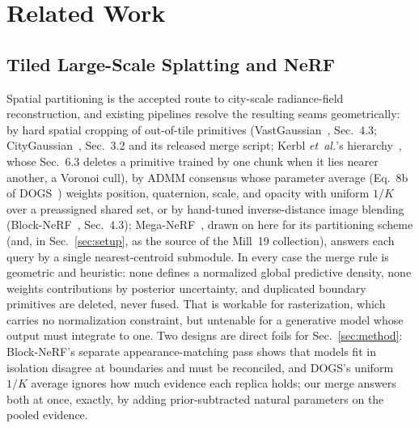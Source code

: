 
\section{Related Work}
\label{sec:related}

\subsection{Tiled Large-Scale Splatting and NeRF}
\label{sec:related-tiled}

 Spatial partitioning is the accepted route to city-scale
radiance-field reconstruction, and existing pipelines resolve the
resulting seams geometrically: by hard spatial cropping of
out-of-tile primitives (VastGaussian~\cite{lin2024vastgaussian},
Sec.~4.3; CityGaussian~\cite{liu2024citygaussian}, Sec.~3.2 and its
released merge script; Kerbl \emph{et~al.}'s
hierarchy~\cite{kerbl2024hierarchical}, whose Sec.~6.3 deletes a
primitive trained by one chunk when it lies nearer another, a Voronoi
cull), by ADMM consensus whose parameter average
(Eq.~8b of DOGS~\cite{chen2024dogs}) weights position, quaternion, scale,
and opacity with uniform $1/K$ over a preassigned shared set, or by
hand-tuned inverse-distance image blending
(Block-NeRF~\cite{tancik2022blocknerf}, Sec.~4.3);
Mega-NeRF~\cite{turki2022meganerf}, drawn on here for its partitioning
scheme (and, in Sec.~\ref{sec:setup}, as the source of the Mill~19
collection), answers each query by a single nearest-centroid submodule.
In every case the merge rule is geometric and heuristic: none defines a
normalized global predictive density, none weights contributions by
posterior uncertainty, and duplicated boundary primitives are deleted,
never fused. That is workable for rasterization, which carries no
normalization constraint, but untenable for a generative model whose
output must integrate to one. Two designs are direct foils
for Sec.~\ref{sec:method}: Block-NeRF's separate appearance-matching
pass shows that models fit in isolation disagree at boundaries and
must be reconciled, and DOGS's uniform $1/K$ average ignores how much
evidence each replica holds; our merge answers both at once, exactly,
by adding prior-subtracted natural parameters on the pooled evidence.

